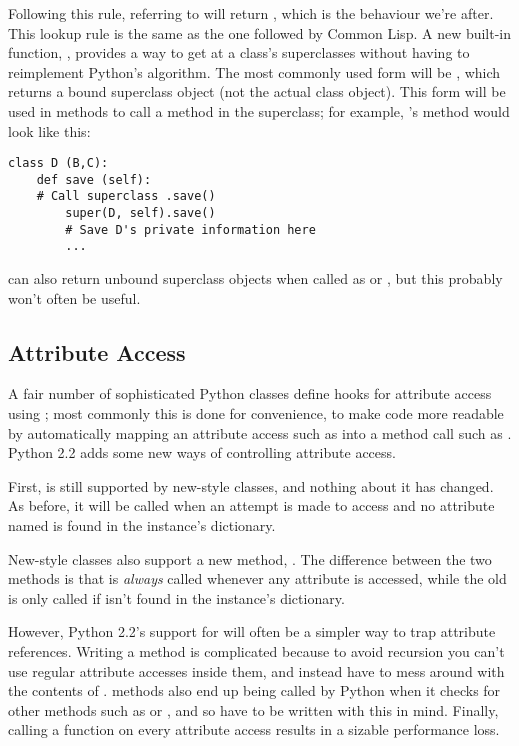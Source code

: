 \documentclass{howto}
\begin{document}
Following this rule, referring to  will return
, which is the behaviour we're after.  This lookup
rule is the same as the one followed by Common Lisp.  A new built-in
function, , provides a way to get at a class's
superclasses without having to reimplement Python's algorithm.
The most commonly used form will be 
, which returns 
a bound superclass object (not the actual class object).  This form
will be used in methods to call a method in the superclass; for
example, 's  method would look like this:

\begin{verbatim}
class D (B,C):
    def save (self):
	# Call superclass .save()
        super(D, self).save()
        # Save D's private information here
        ...
\end{verbatim}

 can also return unbound superclass objects
when called as  or
, but this probably won't
often be useful.


\subsection{Attribute Access}

A fair number of sophisticated Python classes define hooks for
attribute access using ; most commonly this is
done for convenience, to make code more readable by automatically
mapping an attribute access such as  into a method
call such as .  Python 2.2 adds some new ways
of controlling attribute access.

First,  is still supported by
new-style classes, and nothing about it has changed.  As before, it
will be called when an attempt is made to access  and no
attribute named  is found in the instance's dictionary.

New-style classes also support a new method,
.  The difference between
the two methods is that  is \emph{always}
called whenever any attribute is accessed, while the old
 is only called if  isn't found in the
instance's dictionary.

However, Python 2.2's support for  will often be a
simpler way to trap attribute references.  Writing a
 method is complicated because to avoid recursion
you can't use regular attribute accesses inside them, and instead have
to mess around with the contents of .
 methods also end up being called by Python when
it checks for other methods such as  or
, and so have to be written with this in mind.
Finally, calling a function on every attribute access results in a
sizable performance loss.
\end{document}
